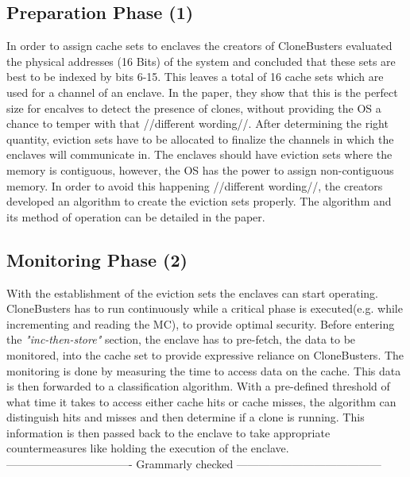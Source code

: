 \subsection{Preparation Phase (1)}
In order to assign cache sets to enclaves the creators of CloneBusters evaluated the physical addresses (16 Bits) of the system and concluded that these sets are best to be indexed by bits 6-15. This leaves a total of 16 cache sets which are used for a channel of an enclave. In the paper, they show that this is the perfect size for encalves to detect the presence of clones, without providing the OS a chance to temper with that //different wording//. 
After determining the right quantity, eviction sets have to be allocated to finalize the channels in which the enclaves will communicate in. The enclaves should have eviction sets where the memory is contiguous, however, the OS has the power to assign non-contiguous memory. In order to avoid this happening //different wording//, the creators developed an algorithm to create the eviction sets properly. The algorithm and its method of operation can be detailed in the paper.

\subsection{Monitoring Phase (2)}
With the establishment of the eviction sets the enclaves can start operating. CloneBusters has to run continuously while a critical phase is executed(e.g. while incrementing and reading the MC), to provide optimal security. Before entering the \textit{"inc-then-store"} section, the enclave has to pre-fetch, the data to be monitored, into the cache set to provide expressive reliance on CloneBusters. 
The monitoring is done by measuring the time to access data on the cache. This data is then forwarded to a classification algorithm. With a pre-defined threshold of what time it takes to access either cache hits or cache misses, the algorithm can distinguish hits and misses and then determine if a clone is running. This information is then passed back to the enclave to take appropriate countermeasures like holding the execution of the enclave.\\
---------------------------------- Grammarly checked ---------------------------------------